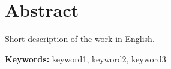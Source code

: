 \chapter*{Abstract}

\begin{otherlanguage}{english}
Short description of the work in English.

\vspace{1em}
\noindent\textbf{Keywords:} keyword1, keyword2, keyword3
\end{otherlanguage}
